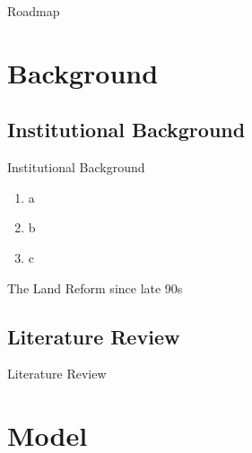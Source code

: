 \documentclass[10pt]{beamer}
\begin{document}
\begin{frame}{Roadmap}
	\tableofcontents[hideallsubsections]
\end{frame}




\section{Background}

\subsection{Institutional Background}

\begin{frame}{Institutional Background}
\linespread{1.5}
\begin{enumerate}
	\item <1> a
	
	\item <2-> b

	\item <3> c
\end{enumerate}
\end{frame}


\begin{frame}{The Land Reform since late 90s}
\linespread{1.5}

\end{frame}



\subsection{Literature Review}

\begin{frame}{Literature Review}
\linespread{1.5}
\small 

\end{frame}


\section{Model}
\end{document}
